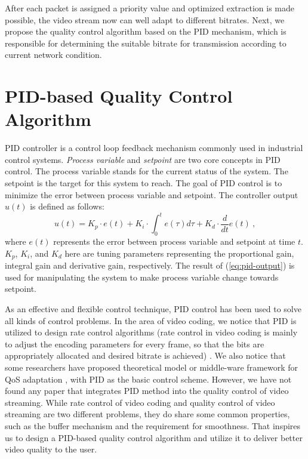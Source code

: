 \documentclass[journal]{IEEEtran}
\begin{document}
After each packet is assigned a priority value and optimized extraction is made possible, the video stream now can well adapt to different bitrates. Next, we propose the quality control algorithm based on the PID mechanism, which is responsible for determining the suitable bitrate for transmission according to current network condition.

\section{PID-based Quality Control Algorithm}
\label{sec:quality-control}

PID controller \cite{PID}\cite{Astrom02} is a control loop feedback mechanism commonly used in industrial control systems. \textit{Process variable} and \textit{setpoint} are two core concepts in PID control. The process variable stands for the current status of the system. The setpoint is the target for this system to reach. The goal of PID control is to minimize the error between process variable and setpoint. The controller output $u(t)$ is defined as follows:
\begin{equation}
\label{eq:pid-output}
u(t) = {K_p} \cdot e(t) + {K_i} \cdot \int_0^t {e(\tau )d\tau }  + {K_d} \cdot \frac{d}{{dt}}e(t) \: ,
\end{equation}
where $e(t)$ represents the error between process variable and setpoint at time $t$. $K_p$, $K_i$, and $K_d$ here are tuning parameters representing the proportional gain, integral gain and derivative gain, respectively. The result of (\ref{eq:pid-output}) is used for manipulating the system to make process variable change towards setpoint.

As an effective and flexible control technique, PID control has been used to solve all kinds of control problems. In the area of video coding, we notice that PID is utilized to design rate control algorithms (rate control in video coding is mainly to adjust the encoding parameters for every frame, so that the bits are appropriately allocated and desired bitrate is achieved) \cite{Wong04}\cite{Yang10}. We also notice that some researchers have proposed theoretical model or middle-ware framework for QoS adaptation \cite{Li98}\cite{Li99}, with PID as the basic control scheme. However, we have not found any paper that integrates PID method into the quality control of video streaming. While rate control of video coding and quality control of video streaming are two different problems, they do share some common properties, such as the buffer mechanism and the requirement for smoothness. That inspires us to design a PID-based quality control algorithm and utilize it to deliver better video quality to the user.
\end{document}
